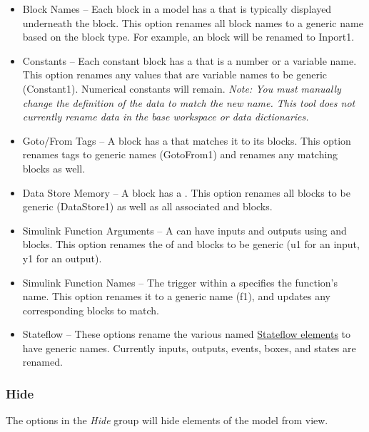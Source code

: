 \documentclass{article}
\begin{document}
\begin{itemize}
	\item Block Names -- Each block in a model has a  that is typically displayed underneath the block. This option renames all block names to a generic name based on the block type. For example, an \inport block will be renamed to Inport1.
	
	\item Constants -- Each constant block has a  that is a number or a variable name. This option renames any values that are variable names to be generic (\eg Constant1). Numerical constants will remain. \emph{Note: You must manually change the definition of the data to match the new name. This tool does not currently rename data in the base workspace or data dictionaries.}
	
	\item Goto/From Tags -- A \goto block has a  that matches it to its \from blocks. This option renames tags to generic names (\eg GotoFrom1) and renames any matching \from blocks as well.
	
	\item Data Store Memory -- A \DSM block has a . This option renames all  \DSM blocks to be generic (\eg DataStore1) as well as all associated \DSR and \DSW blocks.
	
	\item Simulink Function Arguments -- A \simfunc can have inputs and outputs using \argin and \argout blocks. This option renames the  of \argin and \argout blocks to be generic (\eg u1 for an input, y1 for an output).

	\item Simulink Function Names -- The trigger within a \simfunc specifies the function's name. This option renames it to a generic name (\eg f1), and updates any corresponding \simfunccaller blocks to match.
	
	\item Stateflow -- These options rename the various named \href{https://www.mathworks.com/help/stateflow/ug/overview-of-stateflow-objects.html}{Stateflow elements} to have generic names. Currently inputs, outputs, events, boxes, and states are renamed.
\end{itemize}

\subsubsection{Hide}
\label{lbl:hide}
The options in the \emph{Hide} group will hide elements of the model from view.
\end{document}
